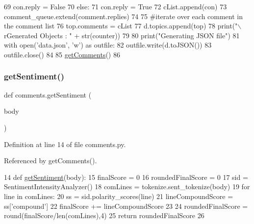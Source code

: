 \begin{DoxyCode}
69                     con.reply = \textcolor{keyword}{False}
70                 \textcolor{keywordflow}{else}:
71                     con.reply = \textcolor{keyword}{True}
72                 cList.append(con)
73                 comment\_queue.extend(comment.replies)
74     
75         \textcolor{comment}{#iterate over each comment in the comment list}
76         top.comments = cList
77         d.topics.append(top)
78         print(\textcolor{stringliteral}{"\(\backslash\)rGenerated Objects : "} + str(counter))
79         
80     print(\textcolor{stringliteral}{"Generating JSON file"})
81     with open(\textcolor{stringliteral}{'data.json'}, \textcolor{stringliteral}{'w'}) \textcolor{keyword}{as} outfile:
82         outfile.write(d.toJSON())
83         outfile.close()
84 
85 \hyperlink{namespacecomments_aadd79f53e655498635ea6597a88b219c}{getComments}()
86 \end{DoxyCode}
\mbox{\label{namespacecomments_a15146b34dd7b539d081e27278c3c322e}} 
\subsubsection{\texorpdfstring{get\+Sentiment()}{getSentiment()}}
{\footnotesize\ttfamily def comments.\+get\+Sentiment (\begin{DoxyParamCaption}\item[{}]{body }\end{DoxyParamCaption})}



Definition at line 14 of file comments.\+py.



Referenced by get\+Comments().


\begin{DoxyCode}
14 \textcolor{keyword}{def }\hyperlink{namespacecomments_a15146b34dd7b539d081e27278c3c322e}{getSentiment}(body):
15     finalScore = 0
16     roundedFinalScore = 0
17     sid = SentimentIntensityAnalyzer()
18     comLines = tokenize.sent\_tokenize(body)
19     \textcolor{keywordflow}{for} line \textcolor{keywordflow}{in} comLines:
20         ss = sid.polarity\_scores(line)
21         lineCompoundScore = ss[\textcolor{stringliteral}{'compound'}]
22         finalScore += lineCompoundScore 
23 
24     roundedFinalScore = round(finalScore/len(comLines),4)
25     \textcolor{keywordflow}{return} roundedFinalScore
26     
\end{DoxyCode}
